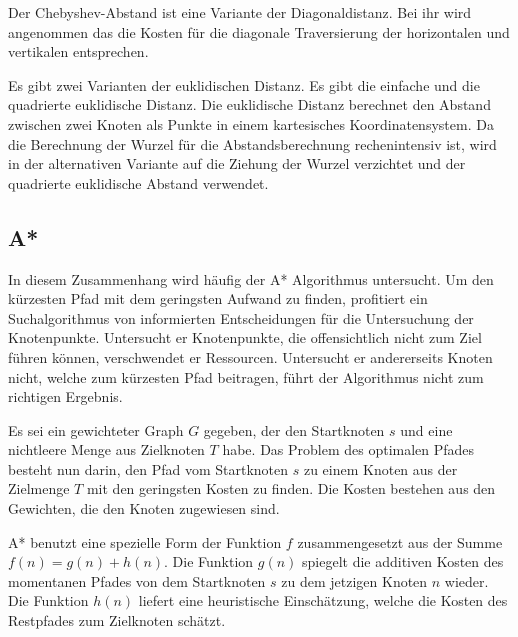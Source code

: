 Der Chebyshev-Abstand ist eine Variante der Diagonaldistanz. Bei ihr wird angenommen das die Kosten für die diagonale Traversierung der horizontalen und vertikalen entsprechen. 

Es gibt zwei Varianten der euklidischen Distanz. Es gibt die einfache und die quadrierte euklidische Distanz. Die euklidische Distanz berechnet den Abstand zwischen zwei Knoten als Punkte in einem kartesisches Koordinatensystem. Da die Berechnung der Wurzel für die Abstandsberechnung rechenintensiv ist, wird in der alternativen Variante auf die Ziehung der Wurzel verzichtet und der quadrierte euklidische Abstand verwendet\cite{YouSurLuhu}.

\subsection{A*} 
In diesem Zusammenhang wird häufig der A* Algorithmus untersucht. Um den kürzesten Pfad mit dem geringsten Aufwand zu finden, profitiert ein Suchalgorithmus von informierten Entscheidungen für die Untersuchung der Knotenpunkte. Untersucht er Knotenpunkte, die offensichtlich nicht zum Ziel führen können, verschwendet er Ressourcen. Untersucht er andererseits Knoten nicht, welche zum kürzesten Pfad beitragen, führt der Algorithmus nicht zum richtigen Ergebnis.

Es sei ein gewichteter Graph $G$ gegeben, der den Startknoten $s$ und eine nichtleere Menge aus Zielknoten $T$ habe. Das Problem des optimalen Pfades besteht nun darin, den Pfad vom Startknoten $s$ zu einem Knoten aus der Zielmenge $T$ mit den geringsten Kosten zu finden. %
Die Kosten bestehen aus den Gewichten, die den Knoten zugewiesen sind\cite{RinaDechterandJudeaPearl.1983}.

A* benutzt eine spezielle Form der Funktion $f$ zusammengesetzt aus der Summe $f(n) = g(n) + h(n)$. Die Funktion $g(n)$ spiegelt die additiven Kosten des momentanen Pfades von dem Startknoten $s$ zu dem jetzigen Knoten $n$ wieder. Die Funktion $h(n)$ liefert eine heuristische Einschätzung, welche die Kosten des Restpfades zum Zielknoten schätzt\cite{RinaDechterandJudeaPearl.1983}. %


